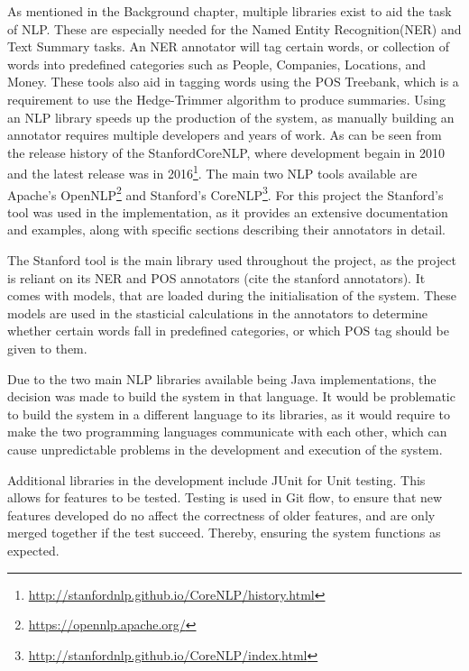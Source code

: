 \par As mentioned in the Background chapter, multiple libraries exist to aid the task of NLP. These are especially needed for the Named Entity Recognition(NER) and Text Summary tasks. An NER annotator will tag certain words, or collection of words into predefined categories such as People, Companies, Locations, and Money. These tools also aid in tagging words using the POS Treebank, which is a requirement to use the Hedge-Trimmer algorithm \cite{dorrzajicschwartz2003} to produce summaries. Using an NLP library speeds up the production of the system, as manually building an annotator requires multiple developers and years of work. As can be seen from the release history of the StanfordCoreNLP, where development begain in 2010 and the latest release was in 2016\footnote{\url{http://stanfordnlp.github.io/CoreNLP/history.html}}. The main two NLP tools available are Apache's OpenNLP\footnote{\url{https://opennlp.apache.org/}} and Stanford's CoreNLP\footnote{\url{http://stanfordnlp.github.io/CoreNLP/index.html}}. For this project the Stanford's tool was used in the implementation, as it provides an extensive documentation and examples, along with specific sections describing their annotators in detail.

\par The Stanford tool is the main library used throughout the project, as the project is reliant on its NER and POS annotators (cite the stanford annotators). It comes with models, that are loaded during the initialisation of the system. These models are used in the stasticial calculations in the annotators to determine whether certain words fall in predefined categories, or which POS tag should be given to them.

\par Due to the two main NLP libraries available being Java implementations, the decision was made to build the system in that language. It would be problematic to build the system in a different language to its libraries, as it would require to make the two programming languages communicate with each other, which can cause unpredictable problems in the development and execution of the system.

\par Additional libraries in the development include JUnit for Unit testing. This allows for features to be tested. Testing is used in Git flow, to ensure that new features developed do no affect the correctness of older features, and are only merged together if the test succeed. Thereby, ensuring the system functions as expected.

